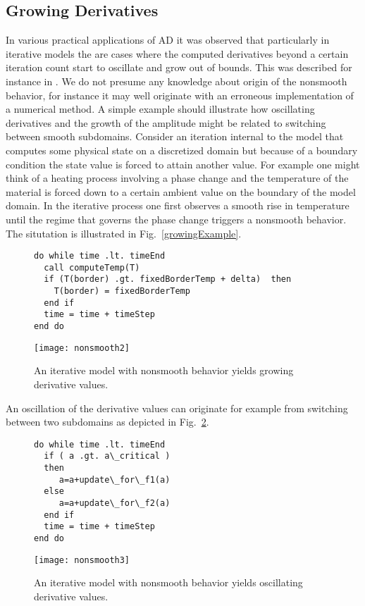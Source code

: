 \documentclass{article}
\newcommand{\reffig}[1]{{Fig.~\ref{#1}}}
\begin{document}
\subsection{Growing Derivatives}
In various practical applications of AD it was observed that particularly in iterative
models the are cases where the  computed derivatives beyond a certain iteration count 
start to oscillate and grow out of bounds. 
This was described for instance in \cite{bischof}. 
We do not presume any knowledge about origin of the nonsmooth behavior, for instance
it may well originate with an erroneous implementation of a numerical method. 
A simple example should illustrate how oscillating derivatives and the growth 
of the amplitude might be related to switching between smooth subdomains. 
Consider an iteration internal to the model that computes some physical state 
on a discretized domain but because of a boundary condition the state value is 
forced to attain another value. For example one might think of a heating process involving 
a phase change and the temperature of the material is forced down to a certain ambient 
value on the boundary of the model domain. 
In the iterative process one first observes a smooth rise in temperature until the 
regime that governs the phase change triggers a nonsmooth behavior. 
The situtation is illustrated in \reffig{growingExample}.
\begin{figure}
\begin{lstlisting}
do while time .lt. timeEnd
  call computeTemp(T)
  if (T(border) .gt. fixedBorderTemp + delta)  then 
    T(border) = fixedBorderTemp 
  end if
  time = time + timeStep
end do  
\end{lstlisting}
\texttt{[image: nonsmooth2]}
\caption{An iterative model with nonsmooth behavior yields 
growing derivative values.}\label{fig:growingExample} 
\end{figure}
An oscillation of the derivative values can originate for example from 
switching between two subdomains as depicted in  \reffig{fig:oscillatingExample}.
\begin{figure}
\begin{lstlisting}
do while time .lt. timeEnd
  if ( a .gt. a\_critical ) 
  then
     a=a+update\_for\_f1(a)
  else 	
     a=a+update\_for\_f2(a)
  end if
  time = time + timeStep
end do  
\end{lstlisting}
\texttt{[image: nonsmooth3]}
\caption{An iterative model with nonsmooth behavior yields 
oscillating derivative values.}\label{fig:oscillatingExample} 
\end{figure}
\end{document}
